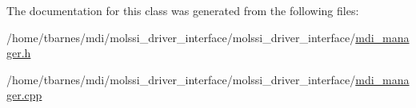 The documentation for this class was generated from the following files\-:\begin{DoxyCompactItemize}
\item 
/home/tbarnes/mdi/molssi\-\_\-driver\-\_\-interface/molssi\-\_\-driver\-\_\-interface/\hyperlink{mdi__manager_8h}{mdi\-\_\-manager.\-h}\item 
/home/tbarnes/mdi/molssi\-\_\-driver\-\_\-interface/molssi\-\_\-driver\-\_\-interface/\hyperlink{mdi__manager_8cpp}{mdi\-\_\-manager.\-cpp}\end{DoxyCompactItemize}
